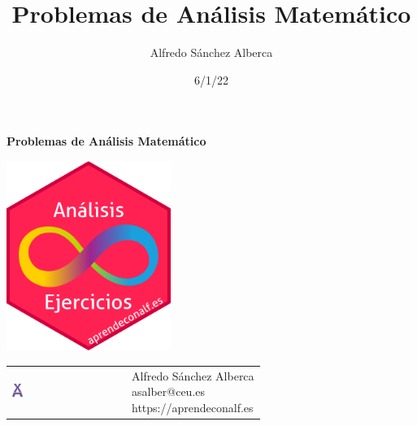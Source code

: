 \documentclass[
  a4paper,
]{scrreport}
\title{Problemas de Análisis Matemático}
\author{Alfredo Sánchez Alberca}
\date{6/1/22}
\renewcommand*\contentsname{Tabla de contenidos}
\newcommand\contentsname{Tabla de contenidos}
\theoremstyle{definition}
\theoremstyle{remark}
\begin{document}
\begin{titlepage}

\begin{center}
\vspace*{5cm}

\Huge
{\textbf{\textsf{Problemas de Análisis Matemático}}}

\vspace{0.5cm}
\LARGE
{\textbf{\textsf{}}}

\vspace{1.5cm}

\includegraphics[width=0.4\textwidth]{img/logos/sticker.png}
\end{center}

\vfill

\begin{flushleft}
\begin{tabular}{ll}
\includegraphics[width=0.1\textwidth]{img/logos/aprendeconalf.png} & \parbox[b]{5cm}{\Large\textsf{Alfredo
Sánchez
Alberca}\\ \textsf{asalber@ceu.es} \\ \textsf{https://aprendeconalf.es}}
\end{tabular}
\end{flushleft}
\end{titlepage}\ifdefined\Shaded\renewenvironment{Shaded}{\begin{tcolorbox}[borderline west={3pt}{0pt}{shadecolor}, interior hidden, enhanced, breakable, frame hidden, boxrule=0pt, sharp corners]}{\end{tcolorbox}}\fi

\renewcommand*\contentsname{Tabla de contenidos}
{
\hypersetup{linkcolor=}
\setcounter{tocdepth}{2}
\tableofcontents
}
\end{document}
